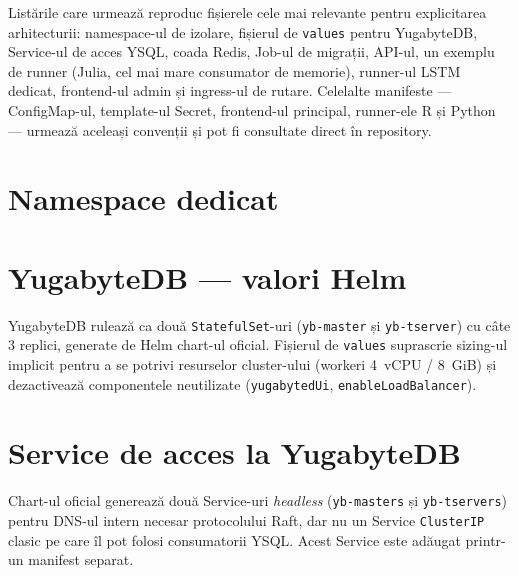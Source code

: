 Listările care urmează reproduc fișierele cele mai relevante pentru
explicitarea arhitecturii: namespace-ul de izolare, fișierul de
\texttt{values} pentru YugabyteDB, Service-ul de acces YSQL, coada
Redis, Job-ul de migrații, API-ul, un exemplu de runner (Julia, cel
mai mare consumator de memorie), runner-ul LSTM dedicat, frontend-ul admin și
ingress-ul de rutare. Celelalte manifeste --- ConfigMap-ul, template-ul Secret,
frontend-ul principal, runner-ele R și Python --- urmează aceleași convenții și pot fi consultate direct
în repository.

\section*{Namespace dedicat}



\section*{YugabyteDB --- valori Helm}

YugabyteDB rulează ca două \texttt{StatefulSet}-uri (\texttt{yb-master}
și \texttt{yb-tserver}) cu câte 3 replici, generate de Helm chart-ul
oficial. Fișierul de \texttt{values} suprascrie sizing-ul implicit
pentru a se potrivi resurselor cluster-ului (workeri 4~vCPU / 8~GiB)
și dezactivează componentele neutilizate (\texttt{yugabytedUi},
\texttt{enableLoadBalancer}).



\section*{Service de acces la YugabyteDB}

Chart-ul oficial generează două Service-uri \emph{headless}
(\texttt{yb-masters} și \texttt{yb-tservers}) pentru DNS-ul intern
necesar protocolului Raft, dar nu un Service \texttt{ClusterIP}
clasic pe care îl pot folosi consumatorii YSQL. Acest Service este
adăugat printr-un manifest separat.




